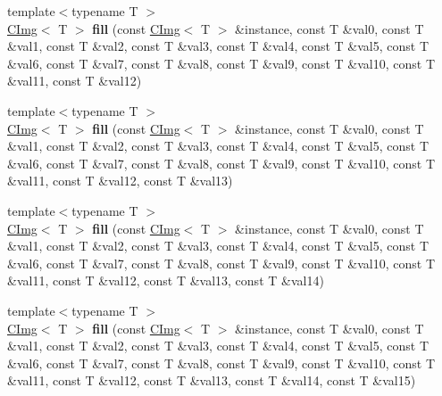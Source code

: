 \begin{DoxyCompactItemize}
\item 
\hypertarget{namespacecimg__library_a8969d26563d078c7134970e2f3e41471}{{\footnotesize template$<$typename T $>$ }\\\hyperlink{structcimg__library_1_1_c_img}{C\-Img}$<$ T $>$ {\bfseries fill} (const \hyperlink{structcimg__library_1_1_c_img}{C\-Img}$<$ T $>$ \&instance, const T \&val0, const T \&val1, const T \&val2, const T \&val3, const T \&val4, const T \&val5, const T \&val6, const T \&val7, const T \&val8, const T \&val9, const T \&val10, const T \&val11, const T \&val12)}\label{namespacecimg__library_a8969d26563d078c7134970e2f3e41471}

\item 
\hypertarget{namespacecimg__library_a10053ecc7c48a39c4963790dcf58c7be}{{\footnotesize template$<$typename T $>$ }\\\hyperlink{structcimg__library_1_1_c_img}{C\-Img}$<$ T $>$ {\bfseries fill} (const \hyperlink{structcimg__library_1_1_c_img}{C\-Img}$<$ T $>$ \&instance, const T \&val0, const T \&val1, const T \&val2, const T \&val3, const T \&val4, const T \&val5, const T \&val6, const T \&val7, const T \&val8, const T \&val9, const T \&val10, const T \&val11, const T \&val12, const T \&val13)}\label{namespacecimg__library_a10053ecc7c48a39c4963790dcf58c7be}

\item 
\hypertarget{namespacecimg__library_a48ab2e6d6d2e053fc2386452f0f33046}{{\footnotesize template$<$typename T $>$ }\\\hyperlink{structcimg__library_1_1_c_img}{C\-Img}$<$ T $>$ {\bfseries fill} (const \hyperlink{structcimg__library_1_1_c_img}{C\-Img}$<$ T $>$ \&instance, const T \&val0, const T \&val1, const T \&val2, const T \&val3, const T \&val4, const T \&val5, const T \&val6, const T \&val7, const T \&val8, const T \&val9, const T \&val10, const T \&val11, const T \&val12, const T \&val13, const T \&val14)}\label{namespacecimg__library_a48ab2e6d6d2e053fc2386452f0f33046}

\item 
\hypertarget{namespacecimg__library_a555b760074388ba9b16e640a75c254d6}{{\footnotesize template$<$typename T $>$ }\\\hyperlink{structcimg__library_1_1_c_img}{C\-Img}$<$ T $>$ {\bfseries fill} (const \hyperlink{structcimg__library_1_1_c_img}{C\-Img}$<$ T $>$ \&instance, const T \&val0, const T \&val1, const T \&val2, const T \&val3, const T \&val4, const T \&val5, const T \&val6, const T \&val7, const T \&val8, const T \&val9, const T \&val10, const T \&val11, const T \&val12, const T \&val13, const T \&val14, const T \&val15)}\label{namespacecimg__library_a555b760074388ba9b16e640a75c254d6}


\end{DoxyCompactItemize}
